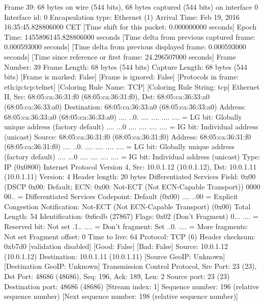 Frame 39: 68 bytes on wire (544 bits), 68 bytes captured (544 bits) on interface 0
    Interface id: 0
    Encapsulation type: Ethernet (1)
    Arrival Time: Feb 19, 2016 16:35:45.828806000 CET
    [Time shift for this packet: 0.000000000 seconds]
    Epoch Time: 1455896145.828806000 seconds
    [Time delta from previous captured frame: 0.000593000 seconds]
    [Time delta from previous displayed frame: 0.000593000 seconds]
    [Time since reference or first frame: 24.296507000 seconds]
    Frame Number: 39
    Frame Length: 68 bytes (544 bits)
    Capture Length: 68 bytes (544 bits)
    [Frame is marked: False]
    [Frame is ignored: False]
    [Protocols in frame: eth:ip:tcp:telnet]
    [Coloring Rule Name: TCP]
    [Coloring Rule String: tcp]
Ethernet II, Src: 68:05:ca:36:31:f0 (68:05:ca:36:31:f0), Dst: 68:05:ca:36:33:a0 (68:05:ca:36:33:a0)
    Destination: 68:05:ca:36:33:a0 (68:05:ca:36:33:a0)
        Address: 68:05:ca:36:33:a0 (68:05:ca:36:33:a0)
        .... ..0. .... .... .... .... = LG bit: Globally unique address (factory default)
        .... ...0 .... .... .... .... = IG bit: Individual address (unicast)
    Source: 68:05:ca:36:31:f0 (68:05:ca:36:31:f0)
        Address: 68:05:ca:36:31:f0 (68:05:ca:36:31:f0)
        .... ..0. .... .... .... .... = LG bit: Globally unique address (factory default)
        .... ...0 .... .... .... .... = IG bit: Individual address (unicast)
    Type: IP (0x0800)
Internet Protocol Version 4, Src: 10.0.1.12 (10.0.1.12), Dst: 10.0.1.11 (10.0.1.11)
    Version: 4
    Header length: 20 bytes
    Differentiated Services Field: 0x00 (DSCP 0x00: Default; ECN: 0x00: Not-ECT (Not ECN-Capable Transport))
        0000 00.. = Differentiated Services Codepoint: Default (0x00)
        .... ..00 = Explicit Congestion Notification: Not-ECT (Not ECN-Capable Transport) (0x00)
    Total Length: 54
    Identification: 0x6cdb (27867)
    Flags: 0x02 (Don't Fragment)
        0... .... = Reserved bit: Not set
        .1.. .... = Don't fragment: Set
        ..0. .... = More fragments: Not set
    Fragment offset: 0
    Time to live: 64
    Protocol: TCP (6)
    Header checksum: 0xb7d0 [validation disabled]
        [Good: False]
        [Bad: False]
    Source: 10.0.1.12 (10.0.1.12)
    Destination: 10.0.1.11 (10.0.1.11)
    [Source GeoIP: Unknown]
    [Destination GeoIP: Unknown]
Transmission Control Protocol, Src Port: 23 (23), Dst Port: 48686 (48686), Seq: 196, Ack: 189, Len: 2
    Source port: 23 (23)
    Destination port: 48686 (48686)
    [Stream index: 1]
    Sequence number: 196    (relative sequence number)
    [Next sequence number: 198    (relative sequence number)]
